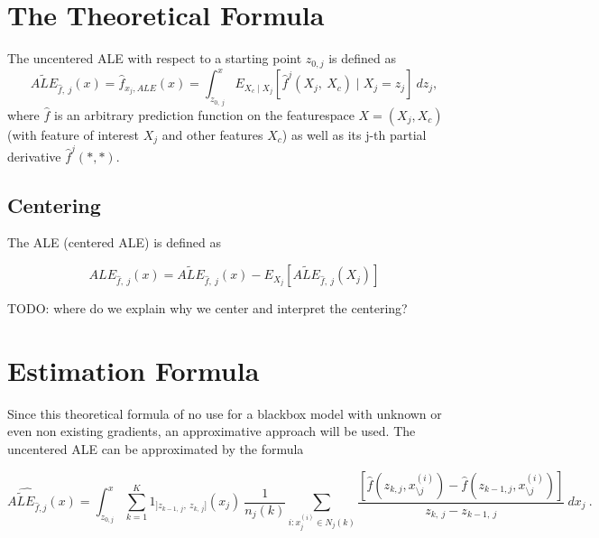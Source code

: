\documentclass[]{krantz}
\begin{document}
\section{The Theoretical Formula}\label{the-theoretical-formula}

The uncentered ALE with respect to a starting point \(z_{0, j}\) is
defined as
\[  \widetilde{ALE}_{\hat{f},~j}(x) = \hat{f}_{x_j,ALE}(x) = \int_{z_{0,~j}}^{x} E_{X_c \mid X_j} [\hat{f}^j(X_j,~X_c)\mid X_j = z_j]~dz_j,\]
where \(\hat{f}\) is an arbitrary prediction function on the
featurespace \(X = (X_j,X_c)\) (with feature of interest \(X_j\) and
other features \(X_c\)) as well as its j-th partial derivative
\(\hat{f}^j(*,*)\).

\subsection{Centering}\label{centering}

The ALE (centered ALE) is defined as

\[  ALE_{\hat{f},~j}(x) = \widetilde{ALE}_{\hat{f},~j}(x) - E_{X_j}[\widetilde{ALE}_{\hat{f},~j}(X_j)]\]

TODO: where do we explain why we center and interpret the centering?

\section{Estimation Formula}\label{estimation-formula}

Since this theoretical formula of no use for a blackbox model with
unknown or even non existing gradients, an approximative approach will
be used. The uncentered ALE can be approximated by the formula

\[ \widehat{\widetilde{ALE}_{\hat{f},j}}(x) = \int_{z_{0,j}}^{x} \sum_{k=1}^{K}   1_{]z_{k-1,~j},~z_{k,~j}]}(x_j) ~ \frac{1}{n_j(k)}\sum_{i:x_j^{(i)}\in N_j(k)} \frac{[\hat{f}(z_{k,j}, x_{\setminus j}^{(i)})-\hat{f}(z_{k-1,j}, x_{\setminus j}^{(i)})]}{z_{k,~j}-z_{k-1,~j}}~dx_j~.  \]
\end{document}
